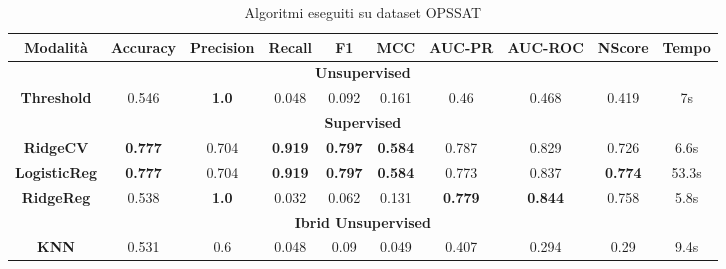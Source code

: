 \begin{table}[h!]
    \centering %
    \begin{adjustbox}{max width=\textwidth}
        \begin{tabular}{|c|c|c|c|c|c|c|c|c|c|}
        \hline
        \textbf{Modalità} & \textbf{Accuracy} &\textbf{Precision}  & \textbf{Recall} & \textbf{F1} & \textbf{MCC} & \textbf{AUC-PR} & \textbf{AUC-ROC} & \textbf{NScore}&\textbf{Tempo}\\
        \hline
        \multicolumn{10}{|c|}{\textbf{Unsupervised}} \\
        \hline
        \textbf{Threshold} & 0.546 & \textbf{1.0} & 0.048 &0.092  & 0.161 & 0.46 & 0.468 & 0.419 &7s \\
        \hline
        \multicolumn{10}{|c|}{\textbf{Supervised}} \\
        \hline
         \textbf{RidgeCV} &\textbf{ 0.777} & 0.704 & \textbf{0.919} &\textbf{0.797}  & \textbf{0.584} & 0.787& 0.829 &0.726&6.6s \\
        \hline
        \textbf{LogisticReg} & \textbf{0.777} & 0.704 & \textbf{0.919} &\textbf{0.797}  &\textbf{ 0.584} & 0.773& 0.837 &\textbf{0.774} &53.3s\\
        \hline
        \textbf{RidgeReg} & 0.538 & \textbf{1.0} & 0.032 &0.062  & 0.131 & \textbf{0.779}& \textbf{0.844} &0.758 &5.8s \\
        \hline
        \multicolumn{10}{|c|}{\textbf{Ibrid Unsupervised}} \\
        \hline
        \textbf{KNN} & 0.531 & 0.6 & 0.048 &0.09  & 0.049 & 0.407& 0.294 &0.29 & 9.4s \\
        \hline
        \end{tabular}
    \end{adjustbox}
    \caption{Algoritmi eseguiti su dataset OPS\textunderscore SAT}
    \label{tab:RocketOPS_SAT}
\end{table}

